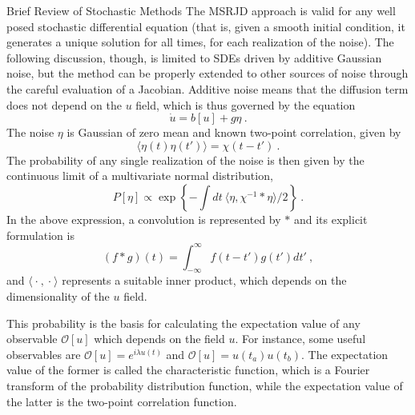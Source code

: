 \begin{chapter}{Brief Review of Stochastic Methods}
The MSRJD approach is valid for any well posed stochastic differential equation (that is, given a smooth initial condition, it generates a unique solution for all times, for each realization of the noise).
The following discussion, though, is limited to SDEs driven by additive Gaussian noise, but the method can be properly extended to other sources of noise through the careful evaluation of a Jacobian.
Additive noise means that the diffusion term does not depend on the $u$ field, which is thus governed by the equation
\begin{equation} \label{eq:additive-langevin}
    \dot u = b[u] + g \eta \ .
\end{equation}
The noise $\eta$ is Gaussian of zero mean and known
two-point correlation, given by
\begin{equation}
    \langle \eta(t) \eta(t') \rangle = \chi(t-t') \ .
\end{equation}
The probability of any single realization of the noise is
then given by the continuous limit of a multivariate normal
distribution,
\begin{equation}
    P[\eta] \propto \exp\left\{-\int dt \ \langle \eta, \chi^{-1} * \eta \rangle / 2\right\} \ .
\end{equation}
In the above expression, a convolution is represented by $*$ and its explicit formulation is
\begin{equation}
    (f*g)(t) = \int_{-\infty}^{\infty} f(t-t') g(t') dt' \ ,
\end{equation}
and $\langle \ \bm\cdot \ , \ \bm\cdot \ \rangle$ represents a
suitable inner product, which depends on the dimensionality of the $u$ field.

This probability is the basis for calculating the expectation
value of any observable $\mathcal{O}[u]$ which depends
on the field $u$. For instance, some useful observables
are $\mathcal{O}[u] = e^{i \lambda u(t)}$ and
$\mathcal{O}[u] = u(t_a) u(t_b)$. The expectation value of the former
is called the characteristic function, which is a Fourier transform of the probability distribution
function, while the expectation value of the latter is the two-point
correlation function.


\end{chapter}
